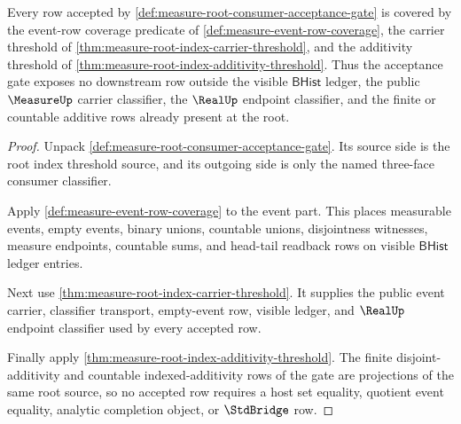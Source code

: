 \begin{theorem}
\label{thm:measure-root-consumer-acceptance-coverage}
Every row accepted by
\autoref{def:measure-root-consumer-acceptance-gate} is covered by the event-row
coverage predicate of \autoref{def:measure-event-row-coverage}, the carrier
threshold of \autoref{thm:measure-root-index-carrier-threshold}, and the
additivity threshold of \autoref{thm:measure-root-index-additivity-threshold}.
Thus the acceptance gate exposes no downstream row outside the visible
$\mathsf{BHist}$ ledger, the public $\MeasureUp$ carrier classifier, the
$\RealUp$ endpoint classifier, and the finite or countable additive rows
already present at the root.
\end{theorem}
\begin{proof}
Unpack \autoref{def:measure-root-consumer-acceptance-gate}. Its source side is
the root index threshold source, and its outgoing side is only the named
three-face consumer classifier.

Apply \autoref{def:measure-event-row-coverage} to the event part. This places
measurable events, empty events, binary unions, countable unions,
disjointness witnesses, measure endpoints, countable sums, and head-tail
readback rows on visible $\mathsf{BHist}$ ledger entries.

Next use \autoref{thm:measure-root-index-carrier-threshold}. It supplies the
public event carrier, classifier transport, empty-event row, visible ledger,
and $\RealUp$ endpoint classifier used by every accepted row.

Finally apply \autoref{thm:measure-root-index-additivity-threshold}. The
finite disjoint-additivity and countable indexed-additivity rows of the gate
are projections of the same root source, so no accepted row requires a host
set equality, quotient event equality, analytic completion object, or
$\StdBridge$ row.
\end{proof}


